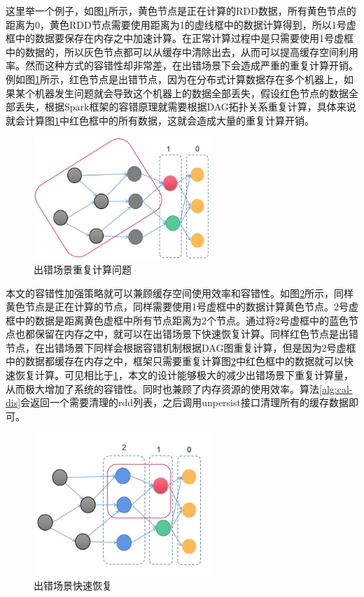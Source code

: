 这里举一个例子，如图\ref{fig:ft1}所示，黄色节点是正在计算的RDD数据，所有黄色节点的距离为0，黄色RDD节点需要使用距离为1的虚线框中的数据计算得到，所以1号虚框中的数据要保存在内存之中加速计算。在正常计算过程中是只需要使用1号虚框中的数据的，所以灰色节点都可以从缓存中清除出去，从而可以提高缓存空间利用率。然而这种方式的容错性却非常差，在出错场景下会造成严重的重复计算开销。例如图\ref{fig:ft1}所示，红色节点是出错节点，因为在分布式计算数据存在多个机器上，如果某个机器发生问题就会导致这个机器上的数据全部丢失，假设红色节点的数据全部丢失，根据Spark框架的容错原理就需要根据DAG拓扑关系重复计算，具体来说就会计算图\ref{fig:ft1}中红色框中的所有数据，这就会造成大量的重复计算开销。

\begin{figure}
    \centering
    \includegraphics[width=0.6\textwidth]{Img/ft1.png}
    \caption{出错场景重复计算问题}
    \label{fig:ft1}
\end{figure}

本文的容错性加强策略就可以兼顾缓存空间使用效率和容错性。如图\ref{fig:ft2}所示，同样黄色节点是正在计算的节点，同样需要使用1号虚框中的数据计算黄色节点。2号虚框中的数据是距离黄色虚框中所有节点距离为2个节点。通过将2号虚框中的蓝色节点也都保留在内存之中，就可以在出错场景下快速恢复计算。同样红色节点是出错节点，在出错场景下同样会根据容错机制根据DAG图重复计算，但是因为2号虚框中的数据都缓存在内存之中，框架只需要重复计算图\ref{fig:ft2}中红色框中的数据就可以快速恢复计算。可见相比于\ref{fig:ft1}，本文的设计能够极大的减少出错场景下重复计算量，从而极大增加了系统的容错性。同时也兼顾了内存资源的使用效率。算法\ref{alg:cal-dis}会返回一个需要清理的rdd列表，之后调用unpersist接口清理所有的缓存数据即可。

\begin{figure}
    \centering
    \includegraphics[width=0.6\textwidth]{Img/ft2.png}
    \caption{出错场景快速恢复}
    \label{fig:ft2}
\end{figure}


